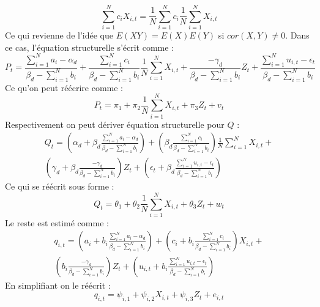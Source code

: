 \documentclass[11pt, a4paper]{article}
\begin{document}
\begin{equation}
    \sum_{i = 1}^{N} c_i  X_{i,t} = \frac{1}{N} \sum_{i = 1}^{N} c_i \frac{1}{N} \sum_{i = 1}^{N} X_{i,t}
\end{equation}
Ce qui revienne de l'idée que $E(XY) = E(X)E(Y)$ si $cor(X,Y) \neq 0$.
Dans ce cas, l'équation structurelle s'écrit comme :
\begin{equation}
  P_t = \frac{\sum_{i = 1}^{N} a_i - \alpha_d}{\beta_d - \sum_{i = 1}^{N} b_i} + 
      \frac{\sum_{i = 1}^{N} c_i}{\beta_d - \sum_{i = 1}^{N} b_i} \frac{1}{N} \sum_{i = 1}^{N} X_{i,t} +
      \frac{-\gamma_d}{\beta_d - \sum_{i = 1}^{N} b_i} Z_t + 
      \frac{\sum_{i = 1}^{N} u_{i,t} - \epsilon_t}{\beta_d - \sum_{i = 1}^{N} b_i}
\end{equation}
Ce qu'on peut réécrire comme :
\begin{equation}
  P_t = \pi_1 + 
      \pi_2 \frac{1}{N} \sum_{i = 1}^{N} X_{i,t} +
      \pi_3 Z_t + 
      v_t
\end{equation}
Respectivement on peut dériver équation structurelle pour $Q$ :
\begin{multline}
    Q_t = (\alpha_d + \beta_d \frac{\sum_{i = 1}^{N} a_i - \alpha_d}{\beta_d - \sum_{i = 1}^{N} b_i}) + 
        (\beta_d \frac{\sum_{i = 1}^{N} c_i}{\beta_d - \sum_{i = 1}^{N} b_i}) \frac{1}{N} \sum_{i = 1}^{N} X_{i,t} + \\
        (\gamma_d + \beta_d \frac{-\gamma_d}{\beta_d - \sum_{i = 1}^{N} b_i}) Z_t + 
        (\epsilon_t + \beta_d \frac{\sum_{i = 1}^{N} u_{i,t} - \epsilon_t}{\beta_d - \sum_{i = 1}^{N} b_i})
\end{multline}
Ce qui se réécrit sous forme :
\begin{equation}
  Q_t = \theta_1 + 
      \theta_2 \frac{1}{N} \sum_{i = 1}^{N} X_{i,t} +
      \theta_3 Z_t + 
      w_t
\end{equation}
Le reste est estimé comme :
\begin{multline}
  q_{i,t} = (a_i + b_i \frac{\sum_{i = 1}^{N} a_i - \alpha_d}{\beta_d - \sum_{i = 1}^{N} b_i}) + 
      (c_i + b_i \frac{\sum_{i = 1}^{N} c_i}{\beta_d - \sum_{i = 1}^{N} b_i}) X_{i,t} + \\
      (b_i \frac{-\gamma_d}{\beta_d - \sum_{i = 1}^{N} b_i}) Z_t + 
      (u_{i,t} + b_i \frac{\sum_{i = 1}^{N} u_{i,t} - \epsilon_t}{\beta_d - \sum_{i = 1}^{N} b_i})
\end{multline}
En simplifiant on le réécrit : 
\begin{equation}
  q_{i,t} = \psi_{i,1} + 
      \psi_{i,2} X_{i,t} +
      \psi_{i,3} Z_t + 
      e_{i,t}
\end{equation}
\end{document}
